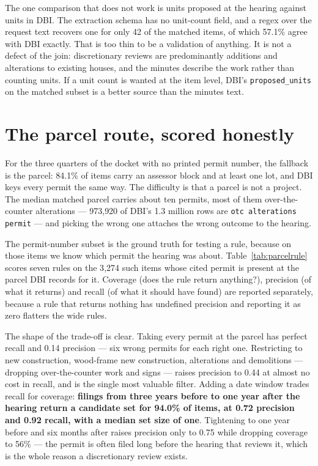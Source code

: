\documentclass[11pt]{article}
\begin{document}
The one comparison that does not work is units proposed at the hearing against units in DBI.
The extraction schema has no unit-count field, and a regex over the request text recovers one
for only 42 of the matched items, of which 57.1\% agree with DBI exactly. That is too thin to
be a validation of anything. It is not a defect of the join: discretionary reviews are
predominantly additions and alterations to existing houses, and the minutes describe the work
rather than counting units. If a unit count is wanted at the item level, DBI's
\texttt{proposed\_units} on the matched subset is a better source than the minutes text.

\section{The parcel route, scored honestly}

For the three quarters of the docket with no printed permit number, the fallback is the
parcel: 84.1\% of items carry an assessor block and at least one lot, and DBI keys every
permit the same way. The difficulty is that a parcel is not a project. The median matched
parcel carries about ten permits, most of them over-the-counter alterations --- 973{,}920 of
DBI's 1.3 million rows are \texttt{otc alterations permit} --- and picking the wrong one
attaches the wrong outcome to the hearing.

The permit-number subset is the ground truth for testing a rule, because on those items we
know which permit the hearing was about. Table~\ref{tab:parcelrule} scores seven rules on the
3{,}274 such items whose cited permit is present at the parcel DBI records for it. Coverage
(does the rule return anything?), precision (of what it returns) and recall (of what it should
have found) are reported separately, because a rule that returns nothing has undefined
precision and reporting it as zero flatters the wide rules.

The shape of the trade-off is clear. Taking every permit at the parcel has perfect recall and
0.14 precision --- six wrong permits for each right one. Restricting to new construction,
wood-frame new construction, alterations and demolitions --- dropping over-the-counter work
and signs --- raises precision to 0.44 at almost no cost in recall, and is the single most
valuable filter. Adding a date window trades recall for coverage: \textbf{filings from three
years before to one year after the hearing return a candidate set for 94.0\% of items, at
0.72 precision and 0.92 recall, with a median set size of one}. Tightening to one year before
and six months after raises precision only to 0.75 while dropping coverage to 56\% --- the
permit is often filed long before the hearing that reviews it, which is the whole reason a
discretionary review exists.
\end{document}

